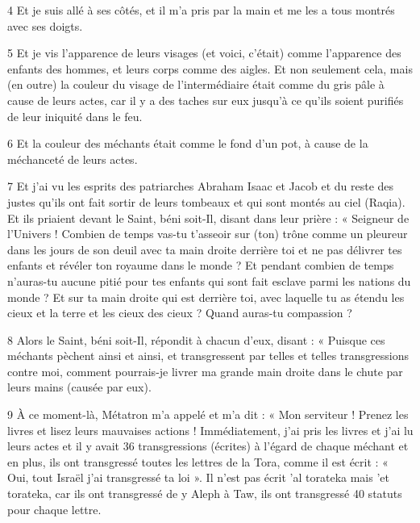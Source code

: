 \par 4 Et je suis allé à ses côtés, et il m'a pris par la main et me les a tous montrés avec ses doigts.

\par 5 Et je vis l'apparence de leurs visages (et voici, c'était) comme l'apparence des enfants des hommes, et leurs corps comme des aigles. Et non seulement cela, mais (en outre) la couleur du visage de l'intermédiaire était comme du gris pâle à cause de leurs actes, car il y a des taches sur eux jusqu'à ce qu'ils soient purifiés de leur iniquité dans le feu.

\par 6 Et la couleur des méchants était comme le fond d'un pot, à cause de la méchanceté de leurs actes.

\par 7 Et j'ai vu les esprits des patriarches Abraham Isaac et Jacob et du reste des justes qu'ils ont fait sortir de leurs tombeaux et qui sont montés au ciel (Raqia). Et ils priaient devant le Saint, béni soit-Il, disant dans leur prière : « Seigneur de l'Univers ! Combien de temps vas-tu t'asseoir sur (ton) trône comme un pleureur dans les jours de son deuil avec ta main droite derrière toi et ne pas délivrer tes enfants et révéler ton royaume dans le monde ? Et pendant combien de temps n'auras-tu aucune pitié pour tes enfants qui sont fait esclave parmi les nations du monde ? Et sur ta main droite qui est derrière toi, avec laquelle tu as étendu les cieux et la terre et les cieux des cieux ? Quand auras-tu compassion ?

\par 8 Alors le Saint, béni soit-Il, répondit à chacun d'eux, disant : « Puisque ces méchants pèchent ainsi et ainsi, et transgressent par telles et telles transgressions contre moi, comment pourrais-je livrer ma grande main droite dans le chute par leurs mains (causée par eux).

\par 9 À ce moment-là, Métatron m'a appelé et m'a dit : « Mon serviteur ! Prenez les livres et lisez leurs mauvaises actions ! Immédiatement, j'ai pris les livres et j'ai lu leurs actes et il y avait 36 ​​transgressions (écrites) à l'égard de chaque méchant et en plus, ils ont transgressé toutes les lettres de la Tora, comme il est écrit : « Oui, tout Israël j’ai transgressé ta loi ». Il n'est pas écrit 'al torateka mais 'et torateka, car ils ont transgressé de y Aleph à Taw, ils ont transgressé 40 statuts pour chaque lettre.

